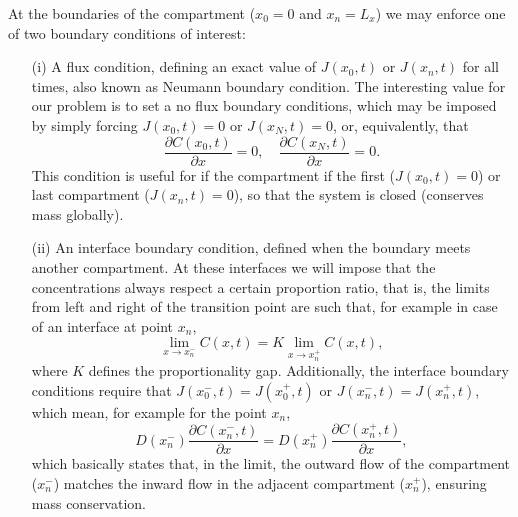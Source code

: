 \documentclass[final,1p,times]{elsarticle}
\begin{document}
At the boundaries of the compartment ($x_0=0$ and $x_n=L_x$) we may enforce one of two boundary conditions of interest:
\begin{enumerate}
\item[(i)] A flux condition, defining an exact value of $J(x_0, t)$ or $J(x_n, t)$ for all times, also known as Neumann boundary condition. The interesting value for our problem is to set a no flux boundary conditions, which may be imposed by simply forcing $J(x_0, t)=0$ or $J(x_N, t)=0$, or, equivalently, that
\begin{equation}
\frac{\partial C(x_0,t)}{\partial x}=0, \quad \frac{\partial C(x_N,t)}{\partial x}=0.
\end{equation}
This condition is useful for if the compartment if the first ($J(x_0, t)=0$) or last compartment ($J(x_n, t)=0$), so that the system is closed (conserves mass globally).
\item[(ii)] An interface boundary condition, defined when the boundary meets another compartment. At these interfaces we will impose that the concentrations always respect a certain proportion ratio, that is, the limits from left and right of the transition point are such that, for example in case of an interface at point $x_n$, 
\begin{equation}
\lim_{x\rightarrow x_n^{-}} C(x, t) = K \lim_{x\rightarrow x_n^{+}} C(x, t),
\end{equation}
where $K$ defines the proportionality gap.
Additionally, the interface boundary conditions require that $J(x_0^-, t)=J(x_0^+, t)$ or  $J(x_n^-, t)=J(x_n^+, t)$, which mean, for example for the point $x_n$,
\begin{equation}
D(x_n^-) \frac{\partial C(x_n^-,t)}{\partial x} = D(x_n^+) \frac{\partial C(x_n^+,t)}{\partial x},
\end{equation}
which basically states that, in the limit, the outward flow of the compartment ($x_n^{-}$) matches the inward flow in the adjacent compartment ($x_n^{+}$), ensuring mass conservation.

\end{enumerate}
\end{document}
